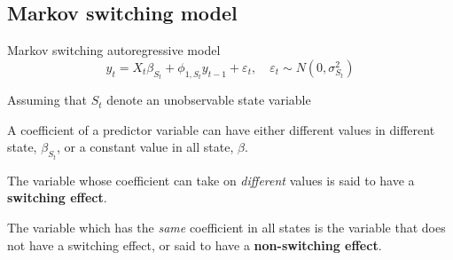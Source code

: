 \documentclass{beamer}
\begin{document}
\subsection{Markov switching model}
\begin{frame}

\begin{block}{Markov switching autoregressive model}
\[
y_{t} = X_{t}\beta_{S_{t}} + \phi_{1,S_{t}} y_{t-1} + \varepsilon_{t}, \quad \varepsilon_{t} \sim N(0,\sigma^{2}_{S_{t}})
\]
\end{block}

Assuming that $S_{t}$ denote an unobservable state variable

\vspace{1em}
\pause
A coefficient of a predictor variable can have either different values in different state, $\beta_{S_{t}}$,  or a constant value in all state, $\beta$. 

\vspace{1em}

The variable whose coefficient can take on \textit{different} values is said to have a \textbf{switching effect}. 

\vspace{1em}

The variable which has the \textit{same} coefficient in all states is the variable that does not have a switching effect, or said to have a \textbf{non-switching effect}. 
\end{frame}

\end{document}
